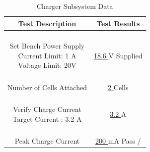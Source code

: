 \documentclass[12pt]{article}
\begin{document}
\begin{table}[h!]
\centering
\caption*{Charger Subsystem Data}
\begin{tabular}{ | c | c | }
\hline
\textbf{Test Description} & \textbf{Test Results} \\
\hline
\parbox{0.5\linewidth}{\raggedright \hfill \\[-0.25 em]
Set Bench Power Supply \\ Current Limit: 1 A \\ Voltage Limit: 20V
\hfill \\[0.1 em]} &  \parbox{0.4\linewidth}{\raggedright \hfill \\ [0.7 em] \underline{\hspace{0.125in}
18.6
\hspace{0.125in}}V Supplied
 \hfill \\ [0.3 em]} \\ 
\hline
\parbox{0.5\linewidth}{\raggedright \hfill \\[-0.25 em]
Number of Cells Attached
\hfill \\[0.1 em]} &  \parbox{0.4\linewidth}{\raggedright \hfill \\ [0.7 em] \underline{\hspace{0.125in}
2
\hspace{0.125in}} Cells 
 \hfill \\ [0.3 em]} \\ 
\hline
\parbox{0.5\linewidth}{\raggedright \hfill \\[-0.25 em]
Verify Charge Current \\
Target Current : 3.2 A 
\hfill \\[0.1 em]} &  \parbox{0.4\linewidth}{\raggedright \hfill \\ [0.7 em] \underline{\hspace{0.125in}
3.2
\hspace{0.125in}} A
 \hfill \\ [0.3 em]} \\ 
\hline
\parbox{0.5\linewidth}{\raggedright \hfill \\[-0.25 em]
Peak Charge Current
\hfill \\[0.1 em]} &  \parbox{0.4\linewidth}{\raggedright \hfill \\ [0.7 em] \underline{\hspace{0.125in}
200
\hspace{0.125in}} mA
\hspace{0.125 in}Pass \space / \space  {} \hfill \\ [0.3 em]} \\ 

\end{tabular}
\end{table}
\end{document}
